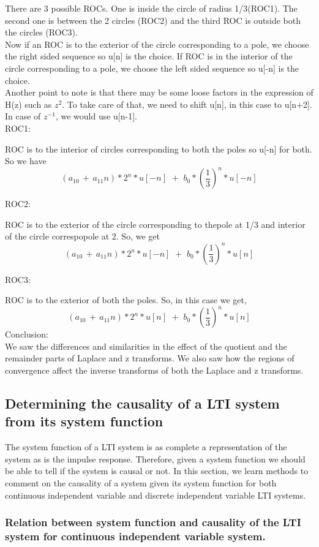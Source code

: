 There are 3 possible ROCs. One is inside the circle of radius 1/3(ROC1). The second one is between the 2 circles (ROC2) and the third ROC is outside both the circles (ROC3). \\
Now if an ROC is to the exterior of the circle corresponding to a pole, we choose the right sided sequence so u[n] is the choice. If ROC is in the interior of the circle corresponding to a pole, we choose the left sided sequence so u[-n] is the choice. \\

Another point to note is that there may be some loose factors in the expression of H(z) such as $z^2$. To take care of that, we need to shift u[n], in this case to u[n+2].
In case of $z^{-1}$, we would use u[n-1]. \\

ROC1:

ROC is to the interior of circles corresponding to both the poles so u[-n] for both.
So we have 
\[(a_{10}\, +\, a_{11}n) * 2^n * u[-n]\,\, +\,\, b_0*({\frac{1}{3}})^n* u[-n]\]

ROC2:

ROC is to the exterior of the circle corresponding to thepole at 1/3 and interior of the circle correspopole at 2.
So, we get
\[(a_{10}\, +\, a_{11}n) * 2^n* u[-n]\,\, +\,\, b_0*({\frac{1}{3}})^n * u[n]\]

ROC3:

ROC is to the exterior of both the poles.
So, in this case we get,
\[(a_{10}\, +\, a_{11}n) * 2^n* u[n]\,\, +\,\, b_0*({\frac{1}{3}})^n* u[n]\]
Conclusion: \\
We saw the differences and similarities in the effect of the quotient and the remainder parts of Laplace and z transforms. We also saw how the regions of convergence affect the inverse transforms of both the Laplace and z transforms.
\subsection{Determining the causality of a LTI system from its system function}
The system function of a LTI system is as complete a representation of the system as is the impulse response. Therefore, given a system function we should be able to tell if the system is causal or not. In this section, we learn methods to comment on the causality of a system given its system function for both continuous independent variable and discrete independent variable LTI systems.
\subsubsection{Relation between system function and causality of the LTI system for continuous independent variable system.}
